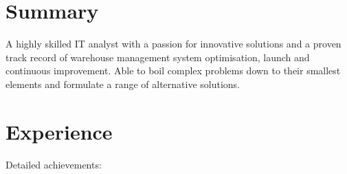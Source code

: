 \documentclass[11pt,a4paper]{moderncv}
\begin{document}
\makecvtitle

\section{Summary}
A highly skilled IT analyst with a passion for innovative solutions and a proven track record of warehouse management system optimisation, launch and continuous improvement. Able to boil complex problems down to their smallest elements and formulate a range of alternative solutions.

\section{Experience}
Detailed achievements:%
\end{document}

